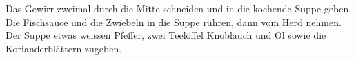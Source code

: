 \begin{multicols}{2}
Das Gewirr zweimal durch die Mitte schneiden und in die kochende Suppe geben.
Die Fischsauce und die Zwiebeln in die Suppe rühren, dann vom Herd nehmen.
Der Suppe etwas weissen Pfeffer, zwei Teelöffel Knoblauch und Öl sowie
die Korianderblättern zugeben.




\end{multicols}
\vfill
